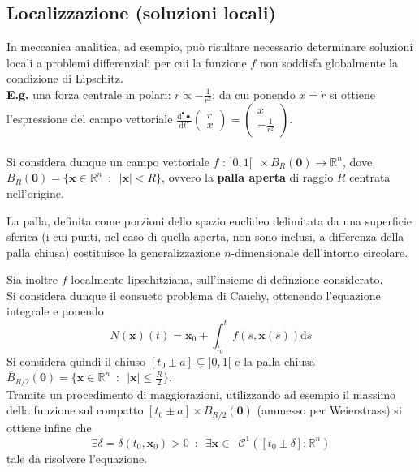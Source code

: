 \documentclass[10pt]{article}
\theoremstyle{plain}
\begin{document}
\subsection{Localizzazione (soluzioni locali)}
In meccanica analitica, ad esempio, può risultare necessario determinare soluzioni locali a problemi differenziali per cui la funzione $f$ non soddisfa globalmente la condizione di Lipschitz.
\\\textbf{E.g.} una forza centrale in polari: $\displaystyle \ddot r \propto - \frac{1}{r^2}$; da cui ponendo $x = \dot r$ si ottiene l'espressione del campo vettoriale $\displaystyle \frac{\textrm{d}^{•} •}{\textrm{d}t^{•}} \begin{pmatrix}
r\\ x
\end{pmatrix} = \begin{pmatrix}
x \\ - \frac{1}{r^2}
\end{pmatrix}$.
\\~\\Si considera dunque un campo vettoriale $f$ : $]0,1[ \enspace \times B_R(\mathbf{0}) \rightarrow \mathbb{R}^n$, dove $\displaystyle B_R(\mathbf{0}) = \{\mathbf{x} \in \mathbb{R}^n \enspace : \enspace |\mathbf{x}| < R\}$, ovvero la \textbf{palla aperta} di raggio $R$ centrata nell'origine. 
\begin{oss}
La palla, definita come porzioni dello spazio euclideo delimitata da una superficie sferica (i cui punti, nel caso di quella aperta, non sono inclusi, a differenza della palla chiusa) costituisce la generalizzazione $n$-dimensionale dell'intorno circolare.
\end{oss} 
Sia inoltre $f$ localmente lipschitziana, sull'insieme di definzione considerato.
\\Si considera dunque il consueto problema di Cauchy, ottenendo l'equazione integrale e ponendo
\[N(\mathbf{x})(t) = \mathbf{x}_0 + \int_{t_0}^tf(s, \mathbf{x}(s))\textrm{d}s\]
Si considera quindi il chiuso $[t_0 \pm a] \subsetneq ]0,1[$ e la palla chiusa $\displaystyle \overline{B}_{R/2}(\mathbf{0}) = \{\mathbf{x} \in \mathbb{R}^n \enspace : \enspace |\mathbf{x}| \leq \frac{R}{2}\}$.
\\Tramite un procedimento di maggiorazioni, utilizzando ad esempio il massimo della funzione sul compatto $[t_0 \pm a] \times \overline{B}_{R/2}(\mathbf{0})$ (ammesso per Weierstrass) si ottiene infine che
\[\exists \delta = \delta(t_0, \mathbf{x}_0) > 0 \enspace : \enspace \exists \mathbf{x} \in \enspace \mathcal{C}^{1}([t_0 \pm \delta] ; \mathbb{R}^n)\]
tale da risolvere l'equazione.
\end{document}
